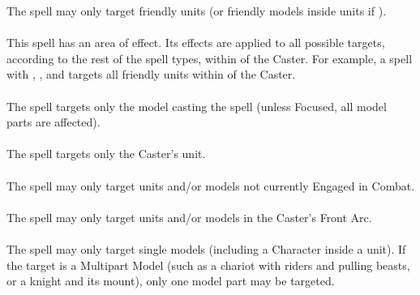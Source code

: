 The spell may only target friendly units (or friendly models inside units if \focused{}).

\paragraph{\aura}

This spell has an area of effect. Its effects are applied to all possible targets, according to the rest of the spell types, within  of the Caster. For example, a spell with \augment{}, \aura{}, and  targets all friendly units within  of the Caster.

\paragraph{\caster}

The spell targets only the model casting the spell (unless Focused, all model parts are affected).

\paragraph{\castersunit}

The spell targets only the Caster's unit.

\paragraph{\damage}

The spell may only target units and/or models not currently Engaged in Combat.

\paragraph{\direct}

The spell may only target units and/or models in the Caster's Front Arc.

\paragraph{\focused}
\label{focused}

The spell may only target single models (including a Character inside a unit). If the target is a Multipart Model (such as a chariot with riders and pulling beasts, or a knight and its mount), only one model part may be targeted.


